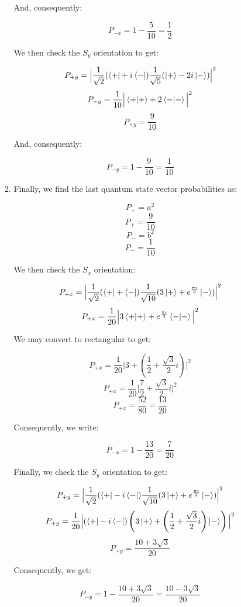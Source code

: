 \begin{enumerate}
\begin{enumerate}
\begin{enumerate}
            And, consequently:

            $$\boxed{P_{-x}=1-\frac{5}{10}=\frac{1}{2}}$$

            We then check the $S_y$ orientation to get:

            $$P_{+y}=\Big|\frac{1}{\sqrt{2}}(\bra{+}+i\bra{-})\frac{1}{\sqrt{5}}(\ket{+}-2i\ket{-})\Big|^2$$
            $$P_{+y}=\frac{1}{10}\Big|\braket{+}+2\braket{-}\Big|^2$$
            $$\boxed{P_{+y}=\frac{9}{10}}$$

            And, consequently:

            $$\boxed{P_{-y}=1-\frac{9}{10}=\frac{1}{10}}$$

          \item Finally, we find the last quantum state vector probabilities as:

            $$P_+=a^2$$
            $$\boxed{P_+=\frac{9}{10}}$$
            $$P_-=b^2$$
            $$\boxed{P_-=\frac{1}{10}}$$

            We then check the $S_x$ orientation:

            $$P_{+x}=\Big|\frac{1}{\sqrt{2}}(\bra{+}+\bra{-})\frac{1}{\sqrt{10}}(3\ket{+}+e^{\frac{\pi i}{3}}\ket{-})\Big|^2$$
            $$P_{+x}=\frac{1}{20}\Big|3\braket{+}+e^{\frac{\pi i}{3}}\braket{-}\Big|^2$$

            We may convert to rectangular to get:

            $$P_{+x}=\frac{1}{20}\Big|3+\left( \frac{1}{2}+\frac{\sqrt{3}}{2}i \right)\Big|^2$$
            $$P_{+x}=\frac{1}{20}\Big|\frac{7}{2}+\frac{\sqrt{3}}{2}i \Big|^2$$
            $$\boxed{P_{+x}=\frac{52}{80}=\frac{13}{20}}$$

            Consequently, we write:

            $$\boxed{P_{-x}=1-\frac{13}{20}=\frac{7}{20}}$$

            Finally, we check the $S_y$ orientation to get:

            $$P_{+y}=\Big|\frac{1}{\sqrt{2}}(\bra{+}-i\bra{-})\frac{1}{\sqrt{10}}(3\ket{+}+e^{\frac{\pi i}{3}}\ket{-})\Big|^2$$
            $$P_{+y}=\frac{1}{20}\Big|(\bra{+}-i\bra{-})\left( 3\ket{+}+\left( \frac{1}{2}+\frac{\sqrt{3}}{2}i \right)\ket{-} \right)\Big|^2$$
            $$\boxed{P_{+y}=\frac{10+3\sqrt{3}}{20}}$$

            Consequently, we get:

            $$\boxed{P_{-y}=1-\frac{10+3\sqrt{3}}{20}}=\frac{10-3\sqrt{3}}{20}$$

        \end{enumerate}


\end{enumerate}
\end{enumerate}
